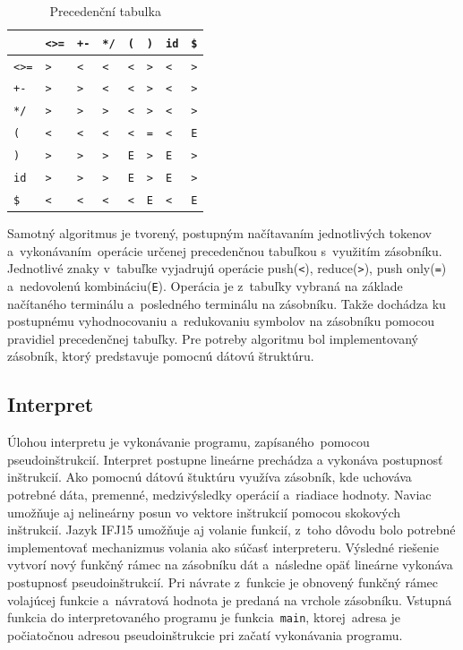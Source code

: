 \documentclass[12pt,a4paper,titlepage,final]{article}
\begin{document}
\begin{table}
\begin{tabular}{ | l | l | l | l | l | l | l | l |  }
\hline
            & \verb+<>=+& \verb;+-; & \verb+*/+ & \verb+(+  & \verb+)+  & \verb+id+ & \verb+$+ \\ \hline
\verb+<>=+  & \verb+>+  & \verb+<+  & \verb+<+  & \verb+<+  & \verb+>+  & \verb+<+  & \verb+>+ \\ \hline
\verb;+-;   & \verb;>;  & \verb;>;  & \verb;<;  & \verb;<;  & \verb;>;  & \verb;<;  & \verb;>; \\ \hline
\verb;*/;   & \verb;>;  & \verb;>;  & \verb;>;  & \verb;<;  & \verb;>;  & \verb;<;  & \verb;>; \\ \hline
\verb;(;    & \verb;<;  & \verb;<;  & \verb;<;  & \verb;<;  & \verb;=;  & \verb;<;  & \verb;E; \\ \hline
\verb;);    & \verb;>;  & \verb;>;  & \verb;>;  & \verb;E;  & \verb;>;  & \verb;E;  & \verb;>; \\ \hline
\verb;id;   & \verb;>;  & \verb;>;  & \verb;>;  & \verb;E;  & \verb;>;  & \verb;E;  & \verb;>; \\ \hline
\verb;$;    & \verb;<;  & \verb;<;  & \verb;<;  & \verb;<;  & \verb;E;  & \verb;<;  & \verb;E; \\ \hline

\end{tabular}
\caption{Precedenční tabulka}
\label{table:prec}
\end{table}

Samotný algoritmus je tvorený, postupným načítavaním jednotlivých tokenov a vykonávaním operácie určenej precedenčnou tabuľkou s využitím zásobníku. Jednotlivé znaky v tabuľke vyjadrujú operácie push(\verb+<+), reduce(\verb+>+), push only(\verb+=+) a nedovolenú kombináciu(\verb+E+). Operácia je z tabuľky vybraná na základe načítaného terminálu a posledného terminálu na zásobníku. Takže dochádza ku postupnému vyhodnocovaniu a redukovaniu symbolov na zásobníku pomocou pravidiel precedenčnej tabuľky. Pre potreby algoritmu bol implementovaný zásobník, ktorý predstavuje pomocnú dátovú štruktúru.


\subsection{Interpret}
Úlohou interpretu je vykonávanie programu, zapísaného pomocou pseudoinštrukcií. Interpret postupne lineárne prechádza a vykonáva postupnosť inštrukcií. Ako pomocnú dátovú štuktúru využíva zásobník, kde uchováva potrebné dáta, premenné, medzivýsledky operácií a riadiace hodnoty. Naviac umožňuje aj nelineárny posun vo vektore inštrukcií pomocou skokových inštrukcií. Jazyk IFJ15 umožňuje aj volanie funkcií, z toho dôvodu bolo potrebné implementovať mechanizmus volania ako súčasť interpreteru. Výsledné riešenie vytvorí nový funkčný rámec na zásobníku dát a následne opäť lineárne vykonáva postupnosť pseudoinštrukcií. Pri návrate z funkcie je obnovený funkčný rámec volajúcej funkcie a návratová hodnota je predaná na vrchole zásobníku. Vstupná funkcia do interpretovaného programu je funkcia \texttt{main}, ktorej adresa je počiatočnou adresou pseudoinštrukcie pri začatí vykonávania programu.
\end{document}
